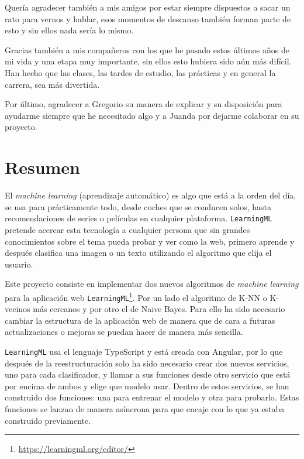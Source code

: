 \documentclass[a4paper, 12pt]{book}
\begin{document}
Quería agradecer también a mis amigos por estar siempre dispuestos a sacar un rato para vernos y hablar, esos momentos de descanso también forman parte de esto y sin ellos nada sería lo mismo.

Gracias también a mis compañeros con los que he pasado estos últimos años de mi vida y una etapa muy importante, sin ellos esto hubiera sido aún más difícil. Han hecho que las clases, las tardes de estudio, las prácticas y en general la carrera, sea más divertida.

Por último, agradecer a Gregorio su manera de explicar y su disposición para ayudarme siempre que he necesitado algo y a Juanda por dejarme colaborar en su proyecto.



\chapter*{Resumen}

El \emph{machine learning} (aprendizaje automático) es algo que está a la orden del día, se usa para prácticamente todo, desde coches que se conducen solos, hasta recomendaciones de series o películas en cualquier plataforma. \texttt{LearningML} pretende acercar esta tecnología a cualquier persona que sin grandes conocimientos sobre el tema pueda probar y ver como la web, primero aprende y después clasifica una imagen o un texto utilizando el algoritmo que elija el usuario.
 
Este proyecto consiste en implementar dos nuevos algoritmos de \emph{machine learning} para la aplicación web \texttt{LearningML}\footnote{\url{https://learningml.org/editor/}}. Por un lado el algoritmo de K-NN o K-vecinos más cercanos y por otro el de Naive Bayes. Para ello ha sido necesario cambiar la estructura de la aplicación web de manera que de cara a futuras actualizaciones o mejoras se puedan hacer de manera más sencilla.

\texttt{LearningML} usa el lenguaje TypeScript y está creada con Angular, por lo que después de la reestructuración solo ha sido necesario crear dos nuevos servicios, uno para cada clasificador, y llamar a sus funciones desde otro servicio que está por encima de ambos y elige que modelo usar. Dentro de estos servicios, se han construido dos funciones: una para entrenar el modelo y otra para probarlo. Estas funciones se lanzan de manera asíncrona para que encaje con lo que ya estaba construido previamente.
\end{document}
